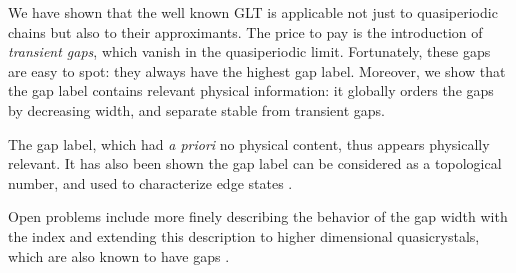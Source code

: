 \documentclass[a4paper]{jpconf}
\begin{document}
We have shown that the well known GLT is applicable not just to quasiperiodic chains but also to their approximants.
The price to pay is the introduction of \emph{transient gaps}, which vanish in the quasiperiodic limit. 
Fortunately, these gaps are easy to spot: they always have the highest gap label.
Moreover, we show that the gap label contains relevant physical information: it globally orders the gaps by decreasing width, and separate stable from transient gaps.

The gap label, which had \emph{a priori} no physical content, thus appears physically relevant.
It has also been shown the gap label can be considered as a topological number, and used to characterize edge states \cite{Levy2015}.

Open problems include more finely describing the behavior of the gap width with the index and extending this description to higher dimensional quasicrystals, which are also known to have gaps \cite{Zijlstra, penrosegaps}.

\begin{fullwidth}
\bibhang=50pt
\printbibliography
\end{fullwidth}
\end{document}
